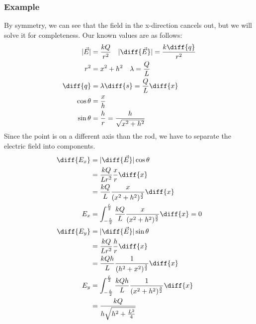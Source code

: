 \documentclass{math}
\begin{document}
\subsubsection*{Example}
\begin{center}
\end{center}
By symmetry, we can see that the field in the x-direction cancels out, but we
will solve it for completeness. Our known values are as follows:
\begin{align*}
  |\vec{E}| &= \frac{kQ}{r^2} \quad
    |\diff{\vec{E}}| = \frac{k\diff{q}}{r^2} \\
  r^2 &= x^2+h^2 \quad \lambda = \frac{Q}{L} \quad \\
  \diff{q} &= \lambda\diff{s} = \frac{Q}{L}\diff{x} \\
  \cos\theta &= \frac{x}{h} \\
  \sin\theta &= \frac{h}{r} = \frac{h}{\sqrt{x^2+h^2}}
\end{align*}
Since the point is on a different axis than the rod, we have to separate the
electric field into components.
\begin{align*}
  \diff{E_x} &= |\diff{\vec{E}}|\cos\theta \\
  &= \frac{kQ}{Lr^2}\frac{x}{r}\diff{x} \\
  &= \frac{kQ}{L}\frac{x}{(x^2+h^2)^{\frac{3}{2}}}\diff{x} \\
  E_x &= \int_{-\frac{L}{2}}^{\frac{L}{2}}
    \frac{kQ}{L}\frac{x}{(x^2+h^2)^{\frac{3}{2}}}\diff{x} = 0 \\
  \diff{E_y} &= |\diff{\vec{E}}|\sin\theta \\
  &= \frac{kQ}{Lr^2}\frac{h}{r}\diff{x} \\
  &= \frac{kQh}{L}\frac{1}{(h^2+x^2)^{\frac{3}{2}}}\diff{x} \\
  E_y &= \int_{-\frac{L}{2}}^{\frac{L}{2}}
    \frac{kQh}{L}\frac{1}{(x^2+h^2)^{\frac{3}{2}}}\diff{x} \\
  &= \frac{kQ}{h\sqrt{h^2+\frac{L^2}{4}}}
\end{align*}
\end{document}
